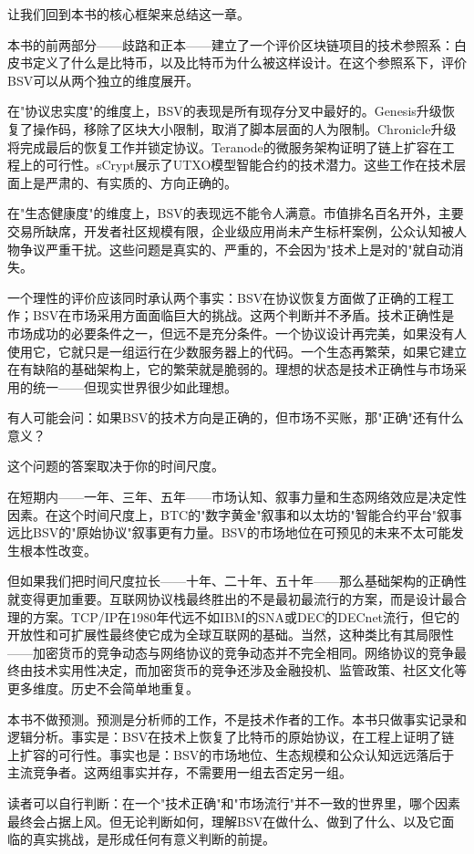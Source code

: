 \documentclass[a4paper,12pt,openany]{ctexbook}
\begin{document}
让我们回到本书的核心框架来总结这一章。

本书的前两部分——歧路和正本——建立了一个评价区块链项目的技术参照系：白皮书定义了什么是比特币，以及比特币为什么被这样设计。在这个参照系下，评价BSV可以从两个独立的维度展开。

在"协议忠实度"的维度上，BSV的表现是所有现存分叉中最好的。Genesis升级恢复了操作码，移除了区块大小限制，取消了脚本层面的人为限制。Chronicle升级将完成最后的恢复工作并锁定协议。Teranode的微服务架构证明了链上扩容在工程上的可行性。sCrypt展示了UTXO模型智能合约的技术潜力。这些工作在技术层面上是严肃的、有实质的、方向正确的。

在"生态健康度"的维度上，BSV的表现远不能令人满意。市值排名百名开外，主要交易所缺席，开发者社区规模有限，企业级应用尚未产生标杆案例，公众认知被人物争议严重干扰。这些问题是真实的、严重的，不会因为"技术上是对的"就自动消失。

一个理性的评价应该同时承认两个事实：BSV在协议恢复方面做了正确的工程工作；BSV在市场采用方面面临巨大的挑战。这两个判断并不矛盾。技术正确性是市场成功的必要条件之一，但远不是充分条件。一个协议设计再完美，如果没有人使用它，它就只是一组运行在少数服务器上的代码。一个生态再繁荣，如果它建立在有缺陷的基础架构上，它的繁荣就是脆弱的。理想的状态是技术正确性与市场采用的统一——但现实世界很少如此理想。

有人可能会问：如果BSV的技术方向是正确的，但市场不买账，那"正确"还有什么意义？

这个问题的答案取决于你的时间尺度。

在短期内——一年、三年、五年——市场认知、叙事力量和生态网络效应是决定性因素。在这个时间尺度上，BTC的"数字黄金"叙事和以太坊的"智能合约平台"叙事远比BSV的"原始协议"叙事更有力量。BSV的市场地位在可预见的未来不太可能发生根本性改变。

但如果我们把时间尺度拉长——十年、二十年、五十年——那么基础架构的正确性就变得更加重要。互联网协议栈最终胜出的不是最初最流行的方案，而是设计最合理的方案。TCP/IP在1980年代远不如IBM的SNA或DEC的DECnet流行，但它的开放性和可扩展性最终使它成为全球互联网的基础。当然，这种类比有其局限性——加密货币的竞争动态与网络协议的竞争动态并不完全相同。网络协议的竞争最终由技术实用性决定，而加密货币的竞争还涉及金融投机、监管政策、社区文化等更多维度。历史不会简单地重复。

本书不做预测。预测是分析师的工作，不是技术作者的工作。本书只做事实记录和逻辑分析。事实是：BSV在技术上恢复了比特币的原始协议，在工程上证明了链上扩容的可行性。事实也是：BSV的市场地位、生态规模和公众认知远远落后于主流竞争者。这两组事实并存，不需要用一组去否定另一组。

读者可以自行判断：在一个"技术正确"和"市场流行"并不一致的世界里，哪个因素最终会占据上风。但无论判断如何，理解BSV在做什么、做到了什么、以及它面临的真实挑战，是形成任何有意义判断的前提。
\end{document}
